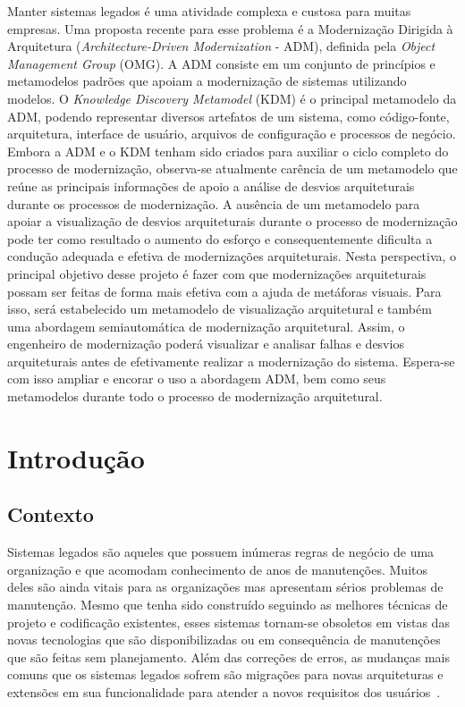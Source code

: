 \documentclass[12pt]{article}
\begin{document}
 

\setlength{\voffset}{0cm}
\setlength{\hoffset}{0cm}



\begin{resumo}
Manter sistemas legados é uma atividade complexa e custosa para muitas empresas. Uma proposta recente para esse problema é a Modernização Dirigida à Arquitetura (\textit{Architecture-Driven Modernization} - ADM), definida pela \textit{Object Management Group} (OMG). A ADM consiste em um conjunto de princípios e metamodelos padrões que apoiam a modernização de sistemas utilizando modelos. O \textit{Knowledge Discovery Metamodel} (KDM) é o principal metamodelo da ADM, podendo representar diversos artefatos de um sistema, como código-fonte, arquitetura, interface de usuário, arquivos de configuração e processos de negócio. Embora a ADM e o KDM tenham sido criados para auxiliar o ciclo completo do processo de modernização, observa-se atualmente carência de um metamodelo que reúne as principais informações de apoio a análise de desvios arquiteturais durante os processos de modernização. A ausência de um metamodelo para apoiar a visualização de desvios arquiteturais durante o processo de modernização pode ter como resultado o aumento do esforço e consequentemente dificulta a condução adequada e efetiva de modernizações arquiteturais. Nesta perspectiva, o principal objetivo desse projeto é fazer com que modernizações arquiteturais possam ser feitas de forma mais efetiva com a ajuda de metáforas visuais. Para isso, será estabelecido um metamodelo de visualização arquitetural e também uma abordagem semiautomática  de modernização arquitetural. Assim, o engenheiro de modernização poderá visualizar e analisar falhas e desvios arquiteturais antes de efetivamente realizar a modernização do sistema. Espera-se com isso ampliar e encorar o uso a abordagem ADM, bem como seus metamodelos durante todo o processo de modernização arquitetural.
\end{resumo}

\section{Introdução}

\subsection{Contexto}

Sistemas legados são aqueles que possuem inúmeras regras de negócio de uma organização e que acomodam conhecimento de anos de manutenções. Muitos deles são ainda vitais para as organizações mas apresentam sérios problemas de manutenção. Mesmo que tenha sido construído seguindo as melhores técnicas de projeto e codificação existentes, esses sistemas tornam-se obsoletos em vistas das novas tecnologias que são disponibilizadas ou em consequência de manutenções que são feitas sem planejamento. Além das correções de erros, as mudanças mais comuns que os sistemas legados sofrem são migrações para novas arquiteturas e extensões em sua funcionalidade para atender a novos requisitos dos usuários~\cite{Krueger92, SoftwareReuse}.
\end{document}
